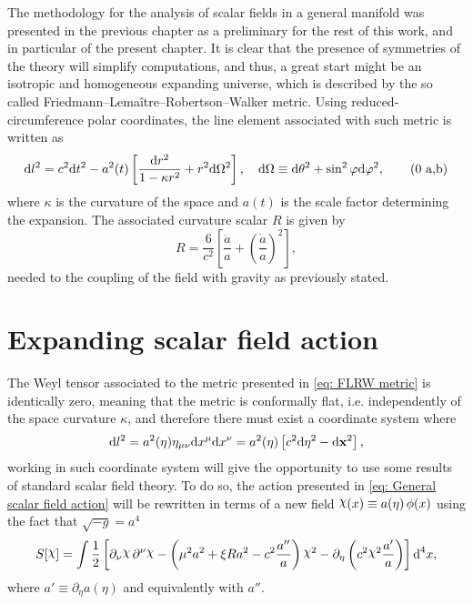 The methodology for the analysis of scalar fields in a general manifold was presented in the previous chapter as a  preliminary for the rest of this work, and in particular of the present chapter. It is clear that the presence of symmetries of the theory will simplify computations, and thus, a great start might be an isotropic and homogeneous expanding universe, which is described by the so called Friedmann–Lemaître–Robertson–Walker metric. Using  reduced-circumference polar coordinates, the line element associated with such metric is written as
\begin{subequations}\label{eq: FLRW metric}
	\begin{gather}
		\text{d} l^2 =c^2\text{d} t^2 -a^2(t)\left[\frac{\text{d} r^2}{1-\kappa r^2}+r^2\text{d}\Omega^2\right],\quad \text{d}\Omega\equiv \text{d}\theta^2+\sin^2\varphi\text{d}\varphi^2,\tag{\theequation \,\,a,b}
	\end{gather}
\end{subequations}
where $\kappa$ is the curvature of the space and $a(t)$ is the scale factor determining the expansion. The associated curvature scalar $R$ is given by
\begin{equation}\label{eq: FLRW Curvature}
	R=\frac{6}{c^2}\left[\frac{\ddot{a}}{a}+\left(\frac{\dot{a}}{a}\right)^2\right],
\end{equation}
needed to the coupling of the field with gravity as previously stated.
\section{Expanding scalar field action}
The Weyl tensor associated to the metric presented in \cref{eq: FLRW metric} is identically zero, meaning that the metric is conformally flat, i.e. independently of the space curvature $\kappa$, and therefore there must exist a coordinate system where
\begin{equation}\label{eq: Conformal FLRW}
	\text{d} l^2=a^2(\eta)\eta_{\mu\nu}\text{d} x^\mu\text{d} x^\nu=a^2(\eta)\left[c^2\text{d} \eta^2-\text{d}\mathbf{x}^2\right],
\end{equation}
working in such coordinate system will give the opportunity to use some results of standard scalar field theory. To do so, the action presented in \cref{eq: General scalar field action} will be rewritten in terms of a new field $\rchi(x)\equiv a(\eta)\,\phi(x)$ using the fact that $\sqrt{-g}=a^4$ 
\begin{equation}
	S[\rchi]=\int\frac{1}{2}\left[\partial_\nu\rchi\,\partial^\nu\rchi-\left(\mu^2a^2+\xi R a^2-c^2\frac{a''}{a}\right)\rchi^2-\partial_\eta\left(c^2\rchi^2\frac{a'}{a}\right)\right]\td^4 x,
\end{equation}
where $a'\equiv \partial_\eta a(\eta)$ and equivalently with $a''$.

